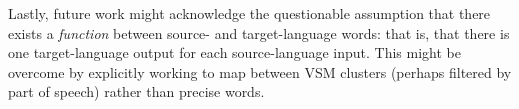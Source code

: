 \documentclass[11pt]{article}
\begin{document}
Lastly, future work might acknowledge the questionable assumption that there
exists a \emph{function} between source- and target-language words: that is,
that there is one target-language output for each source-language input. This
might be overcome by explicitly working to map between VSM clusters (perhaps
filtered by part of speech) rather than precise words. %




\end{document}
